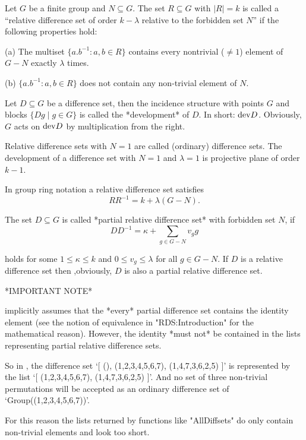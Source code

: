 Let $G$ be a finite group and $N\subseteq G$. The set $R\subseteq G$
with $|R|=k$ is called a ``relative difference set of order
$k-\lambda$ relative to the forbidden set $N$'' if the following
properties hold:

\beginlist%
\item{(a)} The multiset $\{ a.b^{-1}\colon a,b\in R\}$ contains
  every nontrivial ($\neq 1$) element of $G-N$ exactly $\lambda$
  times.  
\item{(b)} $\{ a.b^{-1}\colon a,b\in R\}$ does not contain
  any non-trivial element of $N$.
\endlist

Let $D\subseteq G$ be a difference set, then the incidence structure
with points $G$ and blocks $\{Dg\;|\;g\in G\}$ is called the
*development* of $D$. In short:  ${\rm dev} D$. Obviously, $G$ acts on
${\rm dev}D$ by multiplication from the right.

Relative difference sets with $N=1$ are called (ordinary) difference
sets. The development of a difference set with $N=1$ and $\lambda=1$
is projective plane of order $k-1$.

In group ring notation a relative difference set satisfies
$$
RR^{-1}=k+\lambda(G-N).
$$

The set $D\subseteq G$ is called *partial relative difference set*
with forbidden set $N$, if
$$
    DD^{-1}=\kappa+\sum_{g\in G-N}v_gg   
$$ 

holds for some $1\leq\kappa\leq k$ and $0\leq v_g \leq \lambda$ for
all $g\in G-N$.  If $D$ is a relative difference set then ,obviously,
$D$ is also a partial relative difference set.


*IMPORTANT NOTE*

 implicitly assumes that the *every* partial difference
set contains the identity element (see the notion of equivalence in
"RDS:Introduction" for the mathematical reason). However, the identity
*must not* be contained in the lists representing partial relative
difference sets.

So in , the difference set `[ (), (1,2,3,4,5,6,7),
(1,4,7,3,6,2,5) ]' is represented by the list `[ (1,2,3,4,5,6,7),
(1,4,7,3,6,2,5) ]'. And no set of three non-trivial permutations will
be accepted as an ordinary difference set of `Group((1,2,3,4,5,6,7))'.

For this reason the lists returned by functions like "AllDiffsets" do
only contain non-trivial elements and look too short.



